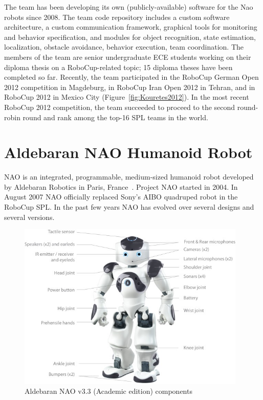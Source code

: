 The team has been developing its own (publicly-available) software for the Nao robots since 2008. The team code repository includes a custom software architecture, a custom communication framework, graphical tools for monitoring and behavior specification, and modules for object recognition, state estimation, localization, obstacle avoidance, behavior execution, team coordination. The members of the team are senior undergraduate ECE students working on their diploma thesis on a RoboCup-related topic; 15 diploma theses have been completed so far. Recently, the team participated in the RoboCup German Open 2012 competition in Magdeburg, in RoboCup Iran Open 2012 in Tehran, and in RoboCup 2012 in Mexico City (Figure~\ref{fig:Kouretes2012}). In the most recent RoboCup 2012 competition, the team succeeded to proceed to the second round-robin round and rank among the top-16 SPL teams in the world.

\section{Aldebaran NAO Humanoid Robot}
NAO is an integrated, programmable, medium-sized humanoid robot developed by Aldebaran Robotics in Paris, France~\cite{naopaper}. Project NAO started in 2004. In August 2007 NAO officially replaced Sony's AIBO quadruped robot in the RoboCup SPL. In the past few years NAO has evolved over several designs and several versions. 

\begin{figure}[t!]
	\begin{center}
		\includegraphics[height = 8cm]{Figures/nao.jpg}
 		\caption{Aldebaran NAO v3.3 (Academic edition) components}
 		\label{fig:sensors}
	\end{center}
\end{figure}

